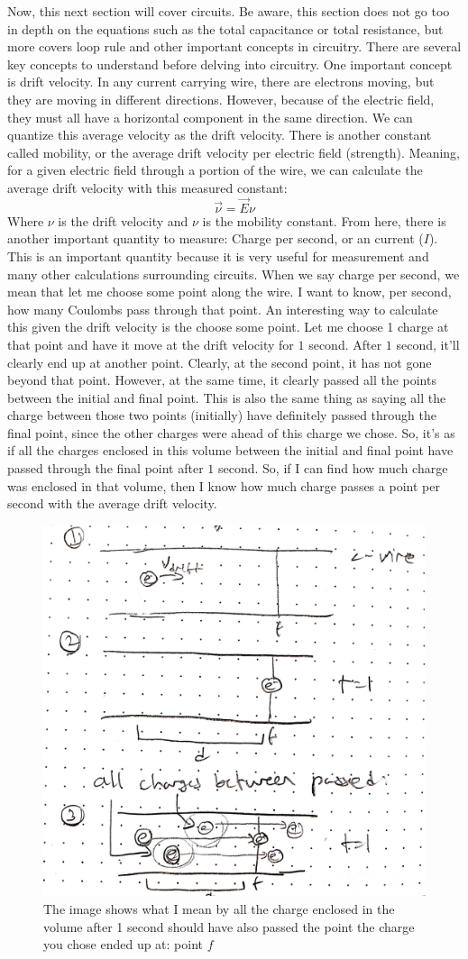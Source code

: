 \documentclass{article}
\begin{document}
Now, this next section will cover circuits. Be aware, this section does not go too in depth on the equations such as the total capacitance or total resistance, but more covers loop rule and other important concepts in circuitry. There are several key concepts to understand before delving into circuitry. One important concept is drift velocity. In any current carrying wire, there are electrons moving, but they are moving in different directions. However, because of the electric field, they must all have a horizontal component in the same direction. We can quantize this average velocity as the drift velocity. There is another constant called mobility, or the average drift velocity per electric field (strength). Meaning, for a given electric field through a portion of the wire, we can calculate the average drift velocity with this measured constant: $$\vec{\nu} = \vec{E}\nu$$Where $\nu$ is the drift velocity and $\nu$ is the mobility constant. From here, there is another important quantity to measure: Charge per second, or an current ($I$). This is an important quantity because it is very useful for measurement and many other calculations surrounding circuits. When we say charge per second, we mean that let me choose some point along the wire. I want to know, per second, how many Coulombs pass through that point. An interesting way to calculate this given the drift velocity is the choose some point. Let me choose 1 charge at that point and have it move at the drift velocity for $1$ second. After $1$ second, it'll clearly end up at another point. Clearly, at the second point, it has not gone beyond that point. However, at the same time, it clearly passed all the points between the initial and final point. This is also the same thing as saying all the charge between those two points (initially) have definitely passed through the final point, since the other charges were ahead of this charge we chose. So, it's as if all the charges enclosed in this volume between the initial and final point have passed through the final point after $1$ second. So, if I can find how much charge was enclosed in that volume, then I know how much charge passes a point per second with the average drift velocity. 
\pagebreak
\begin{figure}[ht]
\center
\includegraphics[width=.3\textwidth]{images/Week2pic3.jpg}
\caption{The image shows what I mean by all the charge enclosed in the volume after 1 second should have also passed the point the charge you chose ended up at: point $f$}
\end{figure}
\end{document}
